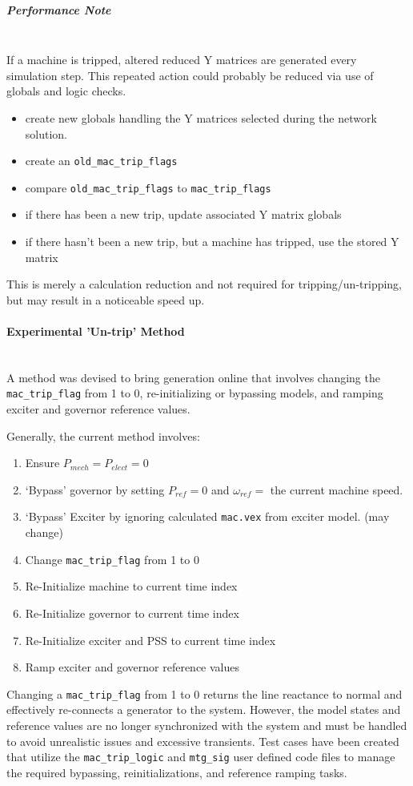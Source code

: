 \documentclass[12pt]{article}
\begin{document}
\subparagraph{Performance Note} \ \\
If a machine is tripped, altered reduced Y matrices are generated every simulation step.
This repeated action could probably be reduced via use of globals and logic checks.
\begin{itemize}
\item create new globals handling the Y matrices selected during the network solution.
\item create an \verb|old_mac_trip_flags|
\item compare \verb|old_mac_trip_flags| to \verb|mac_trip_flags|
\item if there has been a new trip, update associated Y matrix globals
\item if there hasn't been a new trip, but a machine has tripped, use the stored Y matrix
\end{itemize} 
This is merely a calculation reduction and not required for tripping/un-tripping, but may result in a noticeable speed up.

\pagebreak
\paragraph{Experimental 'Un-trip' Method} \ \\
A method was devised to bring generation online that involves changing the \verb|mac_trip_flag| from 1 to 0, re-initializing or bypassing models, and  ramping exciter and governor reference values.

Generally, the current method involves:
\begin{enumerate}
 em
\item Ensure $P_{mech} = P_{elect} = 0$
\item `Bypass' governor by setting $P_{ref} = 0$ and $\omega_{ref} = $ the current machine speed.
\item `Bypass' Exciter by ignoring calculated \verb|mac.vex| from exciter model. (may change)
\item Change \verb|mac_trip_flag| from 1 to 0
\item Re-Initialize machine to current time index
\item Re-Initialize governor to current time index
\item Re-Initialize exciter and PSS to current time index
\item Ramp exciter and governor reference values
\end{enumerate}

Changing a \verb|mac_trip_flag| from 1 to 0 returns the line reactance to normal and effectively re-connects a generator to the system.
However, the model states and reference values are no longer synchronized with the system and must be handled to avoid unrealistic issues and excessive transients.
Test cases have been created that utilize the  \verb|mac_trip_logic| and \verb|mtg_sig| user defined code files to manage the required bypassing, reinitializations, and reference ramping tasks.\\
\end{document}
